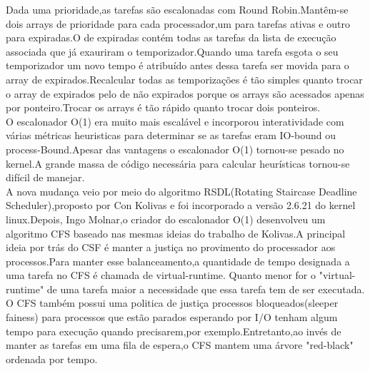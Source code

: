 \documentclass[conference]{IEEEtran}
\begin{document}
 Dada uma prioridade,as tarefas são escalonadas com Round Robin.Mantêm-se dois arrays de prioridade para cada processador,um para tarefas ativas e outro para expiradas.O de expiradas contém todas as tarefas da lista de execução associada que já exauriram o temporizador.Quando uma tarefa esgota o seu temporizador um novo tempo é atribuído antes dessa tarefa ser movida para o array de expirados.Recalcular todas as temporizações é tão simples quanto trocar o array de expirados pelo de não expirados porque os arrays são acessados apenas por ponteiro.Trocar os arrays é tão rápido quanto trocar dois ponteiros\cite{LinuxSchedulerMIT}.\\

 O escalonador O(1) era muito mais escalável e incorporou interatividade com várias métricas heuristicas para determinar se as tarefas eram IO-bound ou process-Bound.Apesar das vantagens o escalonador O(1) tornou-se pesado no kernel.A grande massa de código necessária para calcular heurísticas tornou-se difícil de manejar.\\

 A nova mudança veio por meio do algoritmo RSDL(Rotating Staircase Deadline Scheduler),proposto por Con Kolivas e foi incorporado a versão 2.6.21 do kernel linux.Depois, Ingo Molnar,o criador do escalonador O(1) desenvolveu um algoritmo CFS baseado nas mesmas ideias do trabalho de Kolivas.A principal ideia por trás do CSF é manter a justiça no provimento do processador aos processos.Para manter esse balanceamento,a quantidade de tempo designada a uma tarefa no CFS é chamada de virtual-runtime. Quanto menor for o "virtual-runtime" de uma tarefa maior a necessidade que essa tarefa tem de ser executada.\\
 
O CFS também possui uma politica de justiça processos bloqueados(sleeper fainess) para processos que estão parados esperando por I/O tenham algum tempo para execução quando precisarem,por exemplo.Entretanto,ao invés de manter as tarefas em uma fila de espera,o CFS mantem uma árvore "red-black" ordenada por tempo.\\
\end{document}
